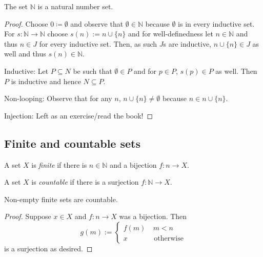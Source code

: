 \documentclass{whrartcl}
\newcommand{\NN}{\mathbb{N}}
\begin{document}
\begin{proposition}
  The set $\NN$ is a natural number set.
\end{proposition}
\begin{proof}
  Choose $0 \coloneq \emptyset$ and observe that $\emptyset \in \NN$ because
  $\emptyset$ is in every inductive set. For $s : \NN \to \NN$ choose $s(n) := n
  \cup \{n\}$ and for well-definedness let $n \in \NN$ and thus $n \in J$ for
  every inductive set. Then, as such $J$s are inductive, $n \cup \{n\} \in J$ as
  well and thus $s(n) \in \NN$.

  Inductive: Let $P \subseteq N$ be such that $\emptyset \in P$ and for $p \in
  P$, $s(p) \in P$ as well. Then $P$ is inductive and hence $N \subseteq P$.

  Non-looping: Observe that for any $n$, $n \cup \{n\} \neq \emptyset$ because
  $n \in n \cup \{n\}$.

  Injection: Left as an exercise/read the book!
\end{proof}

\subsection{Finite and countable sets}

\begin{definition}
  A set $X$ is \emph{finite} if there is $n \in \NN$ and a bijection $f : n \to
  X$.

  A set $X$ is \emph{countable} if there is a surjection $f : \NN \to X$.
\end{definition}

\begin{proposition}
  Non-empty finite sets are countable.
\end{proposition}
\begin{proof}
  Suppose $x \in X$ and $f : n \to X$ was a bijection. Then
  \[
    g(m) :=
    \begin{cases}
      f(m) & ~m < n \\
      x & \text{ otherwise}
    \end{cases}
  \]
  is a surjection as desired.
\end{proof}



\end{document}
